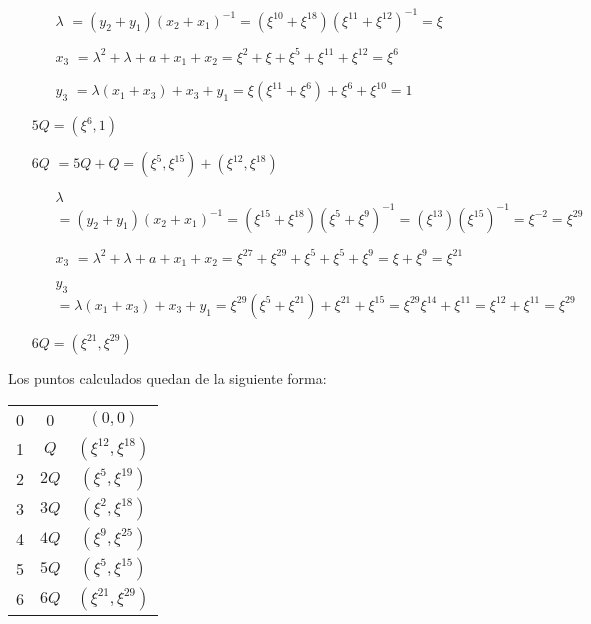 \documentclass[fleqn]{article}
\begin{document}
\begin{itemize}
            \begin{itemize}
                \item[$\lambda$] $ = (y_2 + y_1)(x_2 + x_1)^{-1} = (\xi^{10} + \xi^{18})(\xi^{11} + \xi^{12})^{-1}  = \xi$
                \item[$x_3$] $ = \lambda^2 + \lambda + a + x_1 + x_2 = \xi^{2} + \xi + \xi^{5} + \xi^{11} + \xi^{12} = \xi^{6}$
                \item[$y_3$] $ = \lambda(x_1 + x_3) + x_3 + y_1 = \xi (\xi^{11} + \xi^{6}) + \xi^{6} + \xi^{10} = 1$
            \end{itemize}
            $5Q = (\xi^{6}, 1)$
        \item[$6Q$] $ = 5Q + Q = (\xi^{5}, \xi^{15}) + (\xi^{12}, \xi^{18})$
            \begin{itemize}
                \item[$\lambda$] $ = (y_2 + y_1)(x_2 + x_1)^{-1} = (\xi^{15} + \xi^{18})(\xi^{5} + \xi^{9})^{-1} = (\xi^{13})(\xi^{15})^{-1} = \xi^{-2} = \xi^{29}$
                \item[$x_3$] $ = \lambda^2 + \lambda + a + x_1 + x_2 = \xi^{27} + \xi^{29} + \xi^{5} + \xi^{5} + \xi^{9} = \xi + \xi^{9} = \xi^{21}$
                \item[$y_3$] $ = \lambda(x_1 + x_3) + x_3 + y_1 = \xi^{29} (\xi^{5} + \xi^{21}) + \xi^{21} + \xi^{15} = \xi^{29} \xi^{14} + \xi^{11} = \xi^{12} + \xi^{11} = \xi^{29}$
            \end{itemize}
            $6Q = (\xi^{21}, \xi^{29})$
    \end{itemize}

    Los puntos calculados quedan de la siguiente forma: 
    \begin{center}
        \begin{tabular}{| c | c | c |}
            \hline
            0 & 0 & $(0,0)$\\
            1 & $Q$ & $(\xi^{12}, \xi^{18})$\\
            2 & $2Q$ & $(\xi^{5}, \xi^{19})$\\
            3 & $3Q$ & $(\xi^{2}, \xi^{18})$\\
            4 & $4Q$ & $(\xi^{9}, \xi^{25})$\\
            5 & $5Q$ & $(\xi^{5}, \xi^{15})$\\
            6 & $6Q$ & $(\xi^{21}, \xi^{29})$\\ \hline
        \end{tabular}
    \end{center}
\end{document}

